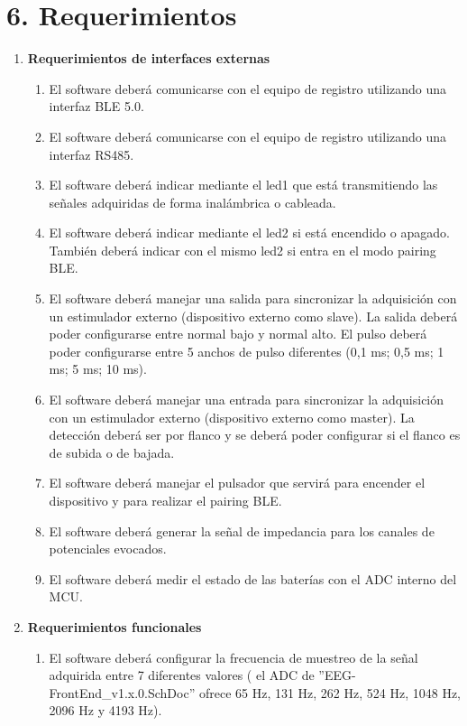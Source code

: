 \documentclass[
11pt, %
codirector, %
]{charter}
\begin{document}
\section{6. Requerimientos}
\label{sec:requerimientos}

\begin{enumerate}
	\item \textbf{Requerimientos de interfaces externas}
		\begin{enumerate}
			\item El software deberá comunicarse con el equipo de registro utilizando una interfaz BLE 5.0.
			\item El software deberá comunicarse con el equipo de registro utilizando una interfaz RS485. 
			\item El software deberá indicar mediante el led1 que está transmitiendo las señales adquiridas de forma inalámbrica o cableada. 
			\item El software deberá indicar mediante el led2 si está encendido o apagado. También deberá indicar con el mismo led2 si entra en el modo pairing BLE.
			\item El software deberá manejar una salida para sincronizar la adquisición con un estimulador externo (dispositivo externo como slave). La salida deberá poder configurarse entre normal bajo y normal alto. El pulso deberá poder configurarse entre 5 anchos de pulso diferentes (0,1 ms; 0,5 ms; 1 ms; 5 ms; 10 ms). 
			\item El software deberá manejar una entrada para sincronizar la adquisición con un estimulador externo (dispositivo externo como master). La detección deberá ser por flanco y se deberá poder configurar si el flanco es de subida o de bajada.
			\item El software deberá manejar el pulsador que servirá para encender el dispositivo y para realizar el pairing BLE.
			\item El software deberá generar la señal de impedancia para los canales de potenciales evocados.
			\item El software deberá medir el estado de las baterías con el ADC interno del MCU.
		\end{enumerate}
	\item \textbf{Requerimientos funcionales}
		\begin{enumerate}
			\item El software deberá configurar la frecuencia de muestreo de la señal adquirida entre 7 diferentes valores ( el ADC de ''EEG-FrontEnd\_v1.x.0.SchDoc” ofrece 65 Hz, 131 Hz, 262 Hz, 524 Hz, 1048 Hz, 2096 Hz y 4193 Hz).

\end{enumerate}
\end{enumerate}
\end{document}
